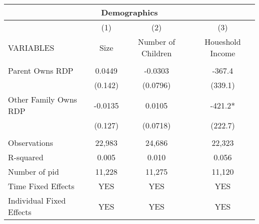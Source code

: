 \begin{tabular}{lccc}
\multicolumn{4}{c}{Demographics} \\ \hline
 & (1) & (2) & (3) \\
VARIABLES & Size & Number of Children & Houeshold Income \\ \hline
 &  &  &  \\
Parent Owns RDP & 0.0449 & -0.0303 & -367.4 \\
 & (0.142) & (0.0796) & (339.1) \\
Other Family Owns RDP & -0.0135 & 0.0105 & -421.2* \\
 & (0.127) & (0.0718) & (222.7) \\
 &  &  &  \\
Observations & 22,983 & 24,686 & 22,323 \\
R-squared & 0.005 & 0.010 & 0.056 \\
Number of pid & 11,228 & 11,275 & 11,120 \\
Time Fixed Effects & YES & YES & YES \\
 Individual Fixed Effects & YES & YES & YES \\ \hline
\end{tabular}
